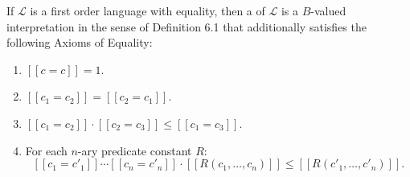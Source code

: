 If $\mathcal{L}$ is a first order language with equality, then a  of $\mathcal{L}$ is a $B$-valued interpretation in the sense of Definition 6.1 that additionally satisfies the following Axioms of Equality:
\begin{enumerate}
\item $[\![c = c]\!] = 1$.
\item $[\![c_1 = c_2]\!] = [\![c_2 = c_1]\!]$.
\item $[\![c_1 = c_2]\!] \cdot [\![c_2 = c_3]\!] \leq [\![c_1 = c_3]\!]$.
\item For each $n$-ary predicate constant $R$:
$$[\![c_1 = c'_1]\!] \cdots [\![c_n = c'_n]\!] \cdot [\![R(c_1, \ldots, c_n)]\!] \leq [\![R(c'_1, \ldots, c'_n)]\!].$$
\end{enumerate}

